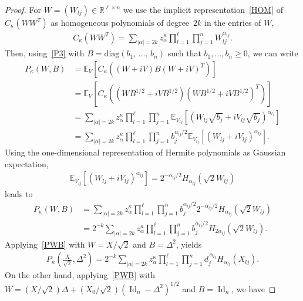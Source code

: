 \documentclass[10pt]{amsart}
\theoremstyle{definition}\newtheorem{defi}[theo]{Definition}\newtheorem{rema}[theo]{Remark}\newtheorem{exam}[theo]{Example}\newtheorem{exem}[theo]{Example}\newtheorem{nota}[theo]{Notation}
\DeclareMathOperator{\Id}{Id}
\newcommand{\diag}{\mathrm{diag}}
\newcommand{\R}{\mathbb{R}}
\newcommand{\EX}[2]{\mathbb{E}_{#1}\left[#2\right]}
\begin{document}
\begin{proof}
For $W=(W_{lj}) \in \R^{\ell\times n}$ we use the implicit representation~\eqref{HOM} of $C_{\kappa}(WW^T)$ as homogeneous polynomials of degree~$2k$ in the entries of $W$,
\begin{gather*}
C_{\kappa}\left(WW^T\right) = \sum_{|\alpha|=2k} z_{\alpha}^{\kappa} \prod_{l=1}^{\ell}\prod_{j=1}^{n} W_{lj}^{\alpha_{ij}}.
\end{gather*}
Then, using~\eqref{P3} with $B=\diag(b_1,\,\ldots,\,b_n)$ such that $b_1,\ldots,b_n\geq0$, we can write
\begin{align*}
P_{\kappa}(W,B) &= \EX{V}{C_{\kappa}\left((W+iV)B(W+iV)^T\right)} \\
&= \EX{V}{C_{\kappa}\left(\left(WB^{1/2}+iVB^{1/2}\right)\left(WB^{1/2}+iVB^{1/2}\right)^T\right)} \\
&= \sum_{|\alpha|=2k} z_{\alpha}^{\kappa} \prod_{l=1}^{\ell}\prod_{j=1}^{n} \EX{V_{lj}}{\left(W_{lj}\sqrt{b_{j}}+iV_{lj}\sqrt{b_{j}}\right)^{\alpha_{lj}}} \\
&= \sum_{|\alpha|=2k} z_{\alpha}^{\kappa} \prod_{l=1}^{\ell}\prod_{j=1}^{n} b_{j}^{\alpha_{lj}/2}\EX{V_{lj}}{\left(W_{lj}+iV_{lj}\right)^{\alpha_{lj}}}.
\end{align*}
Using the one-dimensional representation of Hermite polynomials as Gaussian expectation,
\begin{gather*}
\EX{V_{lj}}{\left(W_{lj}+iV_{lj}\right)^{\alpha_{lj}}} = 2^{-\alpha_{lj}/2}H_{\alpha_{lj}}\left(\sqrt{2}W_{lj}\right)
\end{gather*}
leads to
\begin{equation}\label{PWB}
\begin{split}
P_{\kappa}(W,B) &= \sum_{|\alpha|=2k} z_{\alpha}^{\kappa} \prod_{l=1}^{\ell}\prod_{j=1}^{n} b_{j}^{\alpha_{lj}/2} 2^{-\alpha_{lj}/2}H_{\alpha_{lj}}\left(\sqrt{2}W_{lj}\right)\\
&= 2^{-k}\sum_{|\alpha|=2k} z_{\alpha}^{\kappa} \prod_{l=1}^{\ell}\prod_{j=1}^{n} b_{j}^{\alpha_{lj}/2} H_{2\alpha_{lj}}\left(\sqrt{2}W_{lj}\right).
\end{split}
\end{equation}
Applying~\eqref{PWB} with $W=X/\sqrt{2}$ and $B=\Delta^2$, yields
\begin{gather}\label{Eq1}
P_{\kappa}\left(\frac{X}{\sqrt{2}},\Delta^2\right) = 2^{-k}\sum_{|\alpha|=2k} z_{\alpha}^{\kappa} \prod_{l=1}^{\ell}\prod_{j=1}^{n} d_j^{\,\alpha_{lj}} H_{\alpha_{lj}}(X_{lj}).
\end{gather}
On the other hand, applying~\eqref{PWB} with $W=(X/\sqrt{2})\Delta+(X_0/\sqrt{2})(\Id_n-\Delta^2)^{1/2}$ and $B=\Id_n$, we have

\end{proof}
\end{document}
